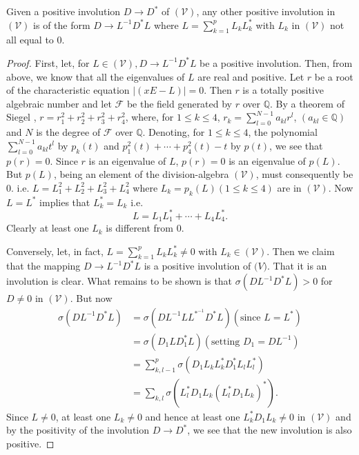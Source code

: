 \begin{proposition}\label{chap1:prop12}
Given a positive involution $D \rightarrow D^{\ast}$ of
$(\mathscr{V})$, any \pageoriginale other positive involution in
$(\mathscr{V})$ is of the form $D \rightarrow L^{-1} D^{\ast}L$ where
$L=\sum\limits^{p}_{k=1}L_k L^{\ast}_k$  with $L_k$ in $(\mathscr{V})$
not all equal to $0$.
\end{proposition}

\begin{proof}
First, let, for $L \in (\mathscr{V}), D \rightarrow L^{-1} D^{\ast}L$
be a positive involution. Then, from above, we know that all the
eigenvalues of $L$ are real and positive. Let $r$ be a root of the
characteristic equation $|(xE-L)|=0$. Then $r$ is a totally positive
algebraic number and let $\mathscr{F}$ be the field generated by $r$
over $\mathbb{Q}$. By a theorem of Siegel \cite{19},
$r=r^2_1+r^2_2+r^2_3+r^2_4$, where, for $1\leq k \leq 4$, $r_k =
\sum\limits^{N-1}_{l=0} a_{kl} r^l$, $(a_{kl}\in\mathbb{Q})$ and $N$
is the degree of $\mathscr{F}$ over $\mathbb{Q}$. Denoting, for $1\leq
k \leq 4$, the polynomial $\sum\limits^{N-1}_{l=0}a_{kl} t^l$ by
$p_k(t)$ and $p^2_1(t) + \cdots + p^2_4(t)-t$ by $p(t)$, we see that
$p(r)=0$. Since $r$ is an eigenvalue of $L$, $p(r)=0$ is an eigenvalue
of $p(L)$. But $p(L)$, being an element of the division-algebra
$(\mathscr{V})$, must consequently be 0. i.e. $L = L^2_1 + L^2_2 +
L^2_3 + L^2_4$ where $L_k = p_k(L) (1\leq k \leq 4)$ are in
$(\mathscr{V})$. Now $L=L^{\ast}$ implies that $L^{\ast}_k = L_k$ i.e.
$$
L=L_1 L^{\ast}_1 + \cdots + L_4 L^{\ast}_4.
$$
Clearly at least one $L_k$ is different from $0$.

Conversely, let, in fact, $L=\sum\limits^p_{k=1}L_k L^{\ast}_k \neq 0$
with $L_k \in (\mathscr{V})$. Then we claim that the mapping $D
\rightarrow L^{-1}D^{\ast}L$ is a positive involution of
$\mathscr(V)$. That it is an involution is clear. What remains to be
shown is that $\sigma (DL^{-1}D^{\ast}L)>0$ for $D\neq 0$ in
$(\mathscr{V})$. But now
\begin{align*}
\sigma(DL^{-1} D^{\ast}L) & = \sigma(DL^{-1} L L^{\ast^{-1}}
D^{\ast}L) (\text{since } L=L^{\ast})\\
& = \sigma (D_1 L D^{\ast}_1 L) (\text{setting } D_1 = D L^{-1})\\
& = \sum^p_{k,l-1} \sigma (D_1 L_k L^{\ast}_k D^{\ast}_1 L_l
L^{\ast}_l)\\
& = \sum_{k,l} \sigma (L^{\ast}_l D_1 L_k (L^{\ast}_l D_1
L_k)^{\ast}).
\end{align*}\pageoriginale
Since $L\neq 0$, at least one $L_k\neq 0$ and hence at least one
$L^{\ast}_k D_1 L_k \neq 0$ in $(\mathscr{V})$ and by the positivity
of the involution $D \rightarrow D^{\ast}$, we see that the new
involution is also positive.
\end{proof}

